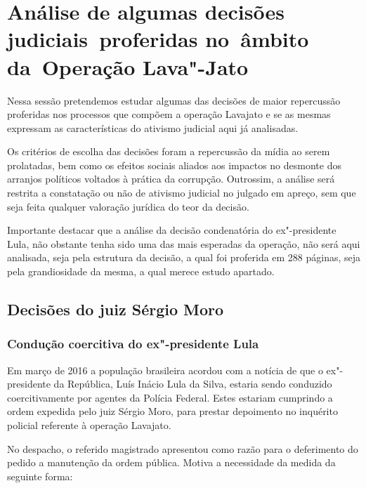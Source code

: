 \section{Análise de algumas decisões judiciais~proferidas no~âmbito da~Operação Lava"-Jato}

Nessa sessão pretendemos estudar algumas das decisões de maior
repercussão proferidas nos processos que compõem a operação Lavajato e
se as mesmas expressam as características do ativismo judicial aqui já
analisadas.

Os critérios de escolha das decisões foram a repercussão da mídia ao
serem prolatadas, bem como os efeitos sociais aliados aos impactos no
desmonte dos arranjos políticos voltados à prática da corrupção.
Outrossim, a análise será restrita a constatação ou não de ativismo
judicial no julgado em apreço, sem que seja feita qualquer valoração
jurídica do teor da decisão.

Importante destacar que a análise da decisão condenatória do ex"-presidente Lula, não obstante tenha sido uma das mais esperadas da operação, não será aqui analisada, seja pela estrutura da decisão, a qual foi proferida em 288 páginas, seja pela grandiosidade da mesma, a qual merece estudo apartado.

\subsection{Decisões do juiz Sérgio Moro}

\subsubsection{Condução coercitiva do ex"-presidente Lula}

Em março de 2016 a população brasileira acordou com a notícia de que o
ex"-presidente da República, Luís Inácio Lula da Silva, estaria sendo
conduzido coercitivamente por agentes da Polícia Federal. Estes estariam
cumprindo a ordem expedida pelo juiz Sérgio Moro, para prestar
depoimento no inquérito policial referente à operação Lavajato.

No despacho, o referido magistrado apresentou como razão para o
deferimento do pedido a manutenção da ordem pública. Motiva a
necessidade da medida da seguinte forma:

